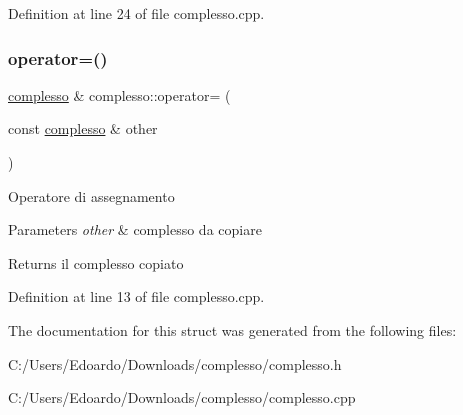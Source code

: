 Definition at line 24 of file complesso.\+cpp.

\mbox{\label{structcomplesso_a48a9213a9253054342ea512923847c84}} 
\subsubsection{\texorpdfstring{operator=()}{operator=()}}
{\footnotesize\ttfamily \mbox{\hyperlink{structcomplesso}{complesso}} \& complesso\+::operator= (\begin{DoxyParamCaption}\item[{const \mbox{\hyperlink{structcomplesso}{complesso}} \&}]{other }\end{DoxyParamCaption})}

Operatore di assegnamento


\begin{DoxyParams}{Parameters}
{\em other} & complesso da copiare \\
\hline
\end{DoxyParams}
\begin{DoxyReturn}{Returns}
il complesso copiato 
\end{DoxyReturn}


Definition at line 13 of file complesso.\+cpp.



The documentation for this struct was generated from the following files\+:\begin{DoxyCompactItemize}
\item 
C\+:/\+Users/\+Edoardo/\+Downloads/complesso/complesso.\+h\item 
C\+:/\+Users/\+Edoardo/\+Downloads/complesso/complesso.\+cpp\end{DoxyCompactItemize}

